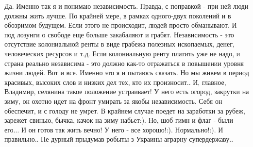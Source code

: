 \begin{itemize}
\begin{itemize}
Да. Именно так я и понимаю независимость. Правда, с поправкой - при ней люди
должны жить лучше. По крайней мере, в рамках одного-двух поколений и в
обозримом будущем. Если этого не происходит, людей просто обманывают. И под
лозунги о свободе еще больше закабаляют и грабят. Независимость - это
отсутствие колониальной ренты в виде грабежа полезных ископаемых, денег,
человеческих ресурсов и т.д. Если колониальную ренту платить уже не надо, и
страна реально независима - это должно как-то отражаться в повышении уровня
жизни людей. Вот и все. Именно это я и пытаюсь сказать. Но мы живем в период
красивых, высоких слов и низких дел тех, кто их произносит.\Smiley[1.0][yellow]. И, главное,
Владимир, селянина такое положение устраивает! У него есть огород, закрутки на
зиму, он охотно идет на фронт умирать за якобы независимость. Себя он
обеспечит, и с голоду не умрет. В крайнем случае поедет на заработки за рубеж,
зарежет свинью, бычка, качок на зиму набьет:). Но, шоб гимн и флаг - были
его... И он готов так жить вечно! У него - все хорошо!:). Нормально!:). И
правильно.\Smiley[1.0][yellow]. Не дурный прыдумав робыты з Украины аграрну супердержаву.\Smiley[1.0][yellow].
\end{itemize}

\end{itemize}

